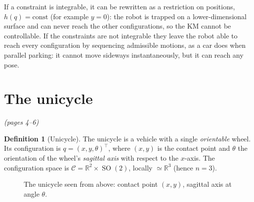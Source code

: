 \documentclass[11pt,a4paper]{article}
\newcommand{\R}{\mathbb{R}}
\DeclareMathOperator{\SO}{SO}
\theoremstyle{definition}
\newtheorem{definition}[theorem]{Definition}
\begin{document}
\begin{intuition}
If a constraint is integrable, it can be rewritten as a restriction on positions, $h(q)=\text{const}$ (for example $y=0$): the robot is trapped on a lower-dimensional surface and can never reach the other configurations, so the KM cannot be controllable. If the constraints are not integrable they leave the robot able to reach every configuration by sequencing admissible motions, as a car does when parallel parking: it cannot move sideways instantaneously, but it can reach any pose.
\end{intuition}

\section{The unicycle}\emph{(pages 4--6)}

\begin{definition}[Unicycle]
The unicycle is a vehicle with a single \emph{orientable} wheel. Its configuration is $q=(x,y,\theta)^{\!\top}$, where $(x,y)$ is the contact point and $\theta$ the orientation of the wheel's \emph{sagittal axis} with respect to the $x$-axis. The configuration space is $\mathcal{C}=\R^2\times \SO(2)$, locally $\simeq\R^3$ (hence $n=3$).
\end{definition}

\begin{figure}[h]
\centering
{}
\caption{The unicycle seen from above: contact point $(x,y)$, sagittal axis at angle $\theta$.}
\end{figure}
\end{document}
